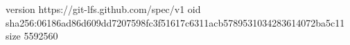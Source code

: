 version https://git-lfs.github.com/spec/v1
oid sha256:06186ad86d609dd7207598fc3f51617c6311acb5789531034283614072ba5c11
size 5592560
